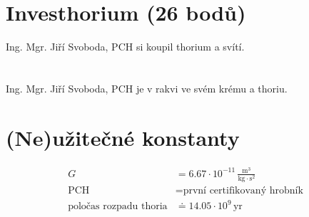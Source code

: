 \documentclass[10pt,a4paper,landscape]{article}
\begin{document}
\begin{multicols}{2}[]
\section{Investhorium (26 bodů)}
Ing. Mgr. Jiří Svoboda, PCH si koupil thorium a svítí.

\section{}
Ing. Mgr. Jiří Svoboda, PCH je v rakvi ve svém krému a thoriu.

\section*{(Ne)užitečné konstanty}
\begin{subequations}
\begin{align*}
G &= 6.67\cdot 10^{-11}\, \frac{\mathrm{m}^3}{\mathrm{kg}\cdot \mathrm{s}^2} \\
\mathrm{PCH} &= \text{první certifikovaný hrobník} \\
\text{poločas rozpadu thoria} &\doteq 14.05\cdot 10^{9}\,\mathrm{yr}
\end{align*}
\end{subequations}

\end{multicols}
\end{document}
